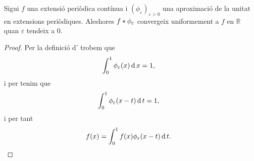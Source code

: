 \documentclass[../../Main.tex]{subfiles}
\begin{document}
	\begin{theorem}
		\label{thm:la convolució per extensions periòdiques és invariant per aproximacions de la unitat en extensions periòdiques}
		Sigui \(f\) una extensió periòdica contínua i \((\phi_{\varepsilon})_{\varepsilon>0}\) una aproximació de la unitat en extensions periòdiques. Aleshores \(f\mathbin{\ast}\phi_{\varepsilon}\) convergeix uniformement a \(f\) en \(\mathbb{R}\) quan \(\varepsilon\) tendeix a \(0\).
		\begin{proof}
			Per la definició d' trobem que
			\[\int_{0}^{1}\phi_{\varepsilon}(x)\operatorname{d} x=1,\]
			i per  tenim que
			\[\int_{0}^{1}\phi_{\varepsilon}(x-t)\operatorname{d} t=1,\]
			i per tant
			\[f(x)=\int_{0}^{1}f(x)\phi_{\varepsilon}(x-t)\operatorname{d} t.\]
			

\end{proof}
\end{theorem}
\end{document}
